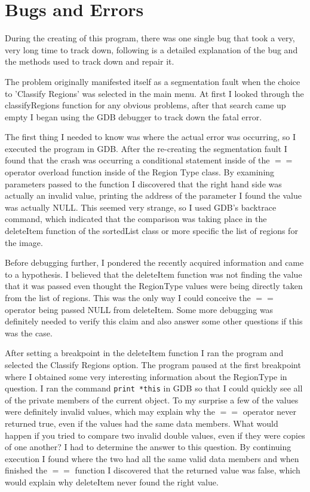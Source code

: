 \documentclass[pdftex, 11pt]{article}
\begin{document}
\section{Bugs and Errors}

During the creating of this program, there was one single bug that took a very, very long time to track down, following
is a detailed explanation of the bug and the methods used to track down and repair it.

The problem originally manifested itself as a segmentation fault when the choice to 'Classify Regions' was selected in
the main menu.  At first I looked through the classifyRegions function for any obvious problems, after that search came
up empty I began using the GDB debugger to track down the fatal error.

The first thing I needed to know was where the actual error was occurring, so I executed the program in GDB.  After the
re-creating the segmentation fault I found that the crash was occurring a conditional statement inside of the $==$
operator overload function inside of the Region Type class.  By examining parameters passed to the function I discovered
that the right hand side was actually an invalid value, printing the address of the parameter I found the value was
actually NULL.  This seemed very strange, so I used GDB's backtrace command, which indicated that the comparison was
taking place in the deleteItem function of the sortedList class or more specific the list of regions for the image.

Before debugging further, I pondered the recently acquired information and came to a hypothesis.  I believed that the
deleteItem function was not finding the value that it was passed even thought the RegionType values were being directly
taken from the list of regions.  This was the only way I could conceive the $==$ operator being passed NULL from
deleteItem.  Some more debugging was definitely needed to verify this claim and also answer some other questions if this
was the case.

After setting a breakpoint in the deleteItem function I ran the program and selected the Classify Regions option.  The
program paused at the first breakpoint where I obtained some very interesting information about the RegionType in
question.  I ran the command \texttt{print *this} in GDB so that I could quickly see all of the private members of the
current object.  To my surprise a few of the values were definitely invalid values, which may explain why the $==$
operator never returned true, even if the values had the same data members.  What would happen if you tried to compare
two invalid double values, even if they were copies of one another?  I had to determine the answer to this question.  By
continuing execution I found where the two had all the same valid data members and when finished the $==$ function I
discovered that the returned value was false, which would explain why deleteItem never found the right value.
\end{document}
